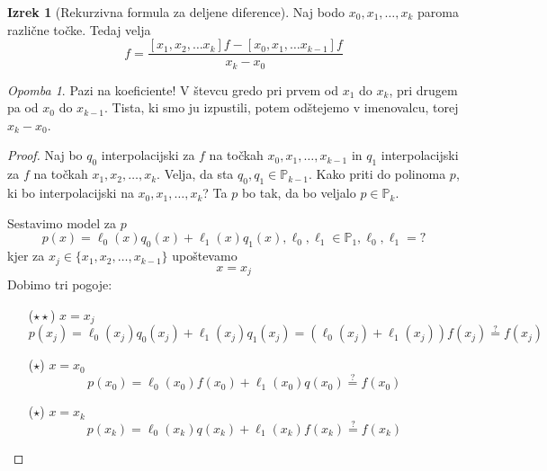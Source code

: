 \documentclass[a4paper,12pt]{article}
\theoremstyle{definition}
\newtheorem{theorem}[counter]{Izrek}
\theoremstyle{remark}
\newtheorem*{rem}{Opomba}
\newcommand{\Pp}{\mathbb{P}}
\begin{document}
\begin{theorem}[Rekurzivna formula za deljene diference]
    Naj bodo $x_0, x_1, \dots, x_k$ paroma različne točke. Tedaj velja
    \begin{equation*}
        [x_0, x_1, \dots, x_k]f = \frac{[x_1, x_2, \dots x_k] f - [x_0, x_1, \dots x_{k-1}]f}{x_k - x_0}
    \end{equation*}
\end{theorem}

\begin{rem}
    Pazi na koeficiente! V števcu gredo pri prvem od $x_1$ do $x_k$, pri drugem pa od $x_0$ do $x_{k-1}$. Tista, ki smo ju izpustili,
    potem odštejemo v imenovalcu, torej $x_k-x_0$.
\end{rem}

\begin{proof}
    Naj bo $q_0$ interpolacijski za $f$ na točkah $x_0, x_1, \dots, x_{k-1}$ in $q_1$ interpolacijski za $f$ na točkah $x_1, x_2, \dots, x_k$.
    Velja, da sta $q_0, q_1 \in \Pp_{k-1}$.
    Kako priti do polinoma $p$, ki bo interpolacijski na $x_0, x_1, \dots, x_k$? Ta $p$ bo tak, da bo veljalo $p \in \Pp_k$.

    Sestavimo model za $p$
    \begin{equation*}
        p(x) = \ell_0(x) q_0(x) + \ell_1(x) q_1(x), \ell_0, \ell_1 \in \Pp_1, \ell_0, \ell_1 = ?
    \end{equation*}
    kjer za $x_j \in \{x_1, x_2, \dots, x_{k-1}\}$ upoštevamo
    \begin{equation*}
        x = x_j
    \end{equation*}
    Dobimo tri pogoje:
    \begin{itemize}

        \item[($\star \star$)] $x = x_j$
        \begin{equation*}
            p(x_j) = \ell_0(x_j) q_0 (x_j) + \ell_1 (x_j) q_1 (x_j) = (\ell_0 (x_j) + \ell_1 (x_j)) f(x_j) \stackrel{\text{?}}{=} f(x_j)
        \end{equation*}

        \item[($\star$)] $x = x_0$
        \begin{equation*}
            p(x_0) = \ell_0(x_0) f(x_0) + \ell_1 (x_0) q(x_0) \stackrel{\text{?}}{=} f(x_0)
        \end{equation*}

        \item[($\star$)] $x = x_k$
        \begin{equation*}
            p(x_k) = \ell_0 (x_k) q(x_k) + \ell_1(x_k) f(x_k) \stackrel{\text{?}}{=} f(x_k)
        \end{equation*}


\end{itemize}
\end{proof}
\end{document}
